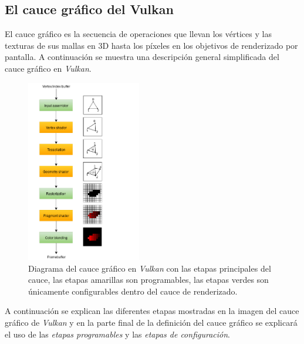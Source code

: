 \documentclass[a4paper]{book}
\begin{document}
\subsection{El cauce gráfico del Vulkan}
\label{subsec:CauceVulkan}

El cauce gráfico es la secuencia de operaciones que llevan los vértices y las texturas de sus mallas en 3D hasta
los píxeles en los objetivos de renderizado por pantalla. A continuación se muestra una descripción general
simplificada del cauce gráfico en \textit{Vulkan}.

\begin{figure}[H]
    \centering
    \includegraphics[width=5cm, keepaspectratio]{img/vulkan_simplified_pipeline.png}
    \caption{Diagrama del cauce gráfico en \textit{Vulkan} con las etapas principales del cauce,
    las etapas amarillas son programables, las etapas verdes son únicamente configurables
    dentro del cauce de renderizado.}
    \label{vulkan_simplified_pipeline}
\end{figure}

A continuación se explican las diferentes etapas mostradas en la imagen del cauce gráfico de \textit{Vulkan}
y en la parte final de la definición del cauce gráfico se explicará el uso de las \textit{etapas programables}
y las \textit{etapas de configuración}.
\end{document}

